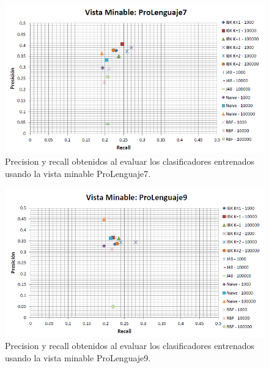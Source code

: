\documentclass{article}
\begin{document}
\begin{figure}[!htb]
\begin{centering}
\includegraphics[scale=0.8]{prolenguaje7}
\par\end{centering}
\caption{Precision y recall obtenidos al evaluar los clasificadores entrenados usando la vista minable ProLenguaje7.}
\label{fig:figura14}
\end{figure}

\begin{figure}[!htb]
\begin{centering}
\includegraphics[scale=0.8]{prolenguaje9}
\par\end{centering}
\caption{Precision y recall obtenidos al evaluar los clasificadores entrenados usando la vista minable ProLenguaje9.}
\label{fig:figura15}
\end{figure}
\end{document}
